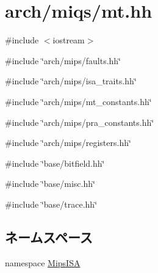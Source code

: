 \hypertarget{miqs_2mt_8hh}{
\section{arch/miqs/mt.hh}
\label{miqs_2mt_8hh}
}
{\ttfamily \#include $<$iostream$>$}\par
{\ttfamily \#include \char`\"{}arch/mips/faults.hh\char`\"{}}\par
{\ttfamily \#include \char`\"{}arch/mips/isa\_\-traits.hh\char`\"{}}\par
{\ttfamily \#include \char`\"{}arch/mips/mt\_\-constants.hh\char`\"{}}\par
{\ttfamily \#include \char`\"{}arch/mips/pra\_\-constants.hh\char`\"{}}\par
{\ttfamily \#include \char`\"{}arch/mips/registers.hh\char`\"{}}\par
{\ttfamily \#include \char`\"{}base/bitfield.hh\char`\"{}}\par
{\ttfamily \#include \char`\"{}base/misc.hh\char`\"{}}\par
{\ttfamily \#include \char`\"{}base/trace.hh\char`\"{}}\par
\subsection*{ネームスペース}
\begin{DoxyCompactItemize}
\item 
namespace \hyperlink{namespaceMipsISA}{MipsISA}
\end{DoxyCompactItemize}
